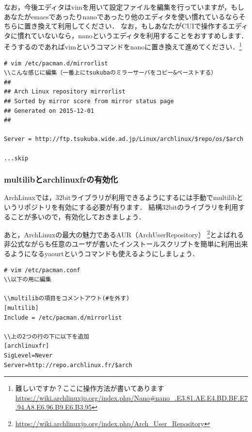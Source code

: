 \documentclass[b5j,twoside,openany]{jsbook}
\begin{document}
        なお，今後エディタはvimを用いて設定ファイルを編集を行っていますが，もしあなたがemacsであったりnanoであったり他のエディタを使い慣れているならそちらに置き換えて利用してください．
        なお，もしあなたがCUIで操作するエディタに慣れていないなら，nanoというエディタを利用することをおすすめします．そうするのであればvimというコマンドをnanoに置き換えて進めてください．\footnote{難しいですか？ここに操作方法が書いてあります \url{https://wiki.archlinuxjp.org/index.php/Nano#nano_.E3.81.AE.E4.BD.BF.E7.94.A8.E6.96.B9.E6.B3.95}}

         \begin{screen}
\begin{verbatim}
# vim /etc/pacman.d/mirrorlist
\\こんな感じに編集（一番上にtsukubaのミラーサーバをコピー&ペーストする）
##
## Arch Linux repository mirrorlist
## Sorted by mirror score from mirror status page
## Generated on 2015-12-01
##

Server = http://ftp.tsukuba.wide.ad.jp/Linux/archlinux/$repo/os/$arch

...skip
\end{verbatim}
        \end{screen}

      \subsubsection{multilibとarchlinuxfrの有効化}
        ArchLinuxでは，32bitライブラリが利用できるようにするには手動でmultilibというリポジトリを有効にする必要が有ります．
        結構32bitのライブラリを利用することが多いので，有効化しておきましょう．
        
        あと，ArchLinuxの最大の魅力であるAUR（ArchUserRepository） \footnote{\url{https://wiki.archlinuxjp.org/index.php/Arch_User_Repository}}とよばれる非公式ながらも任意のユーザが書いたインストールスクリプトを簡単に利用出来るようになるyaourtというコマンドも使えるようにしましょう．

        \begin{screen}
\begin{verbatim}
# vim /etc/pacman.conf
\\以下の用に編集

\\multilibの項目をコメントアウト(#を外す)
[multilib]
Include = /etc/pacman.d/mirrorlist

\\上の2つの行の下に以下を追加
[archlinuxfr]
SigLevel=Never
Server=http://repo.archlinux.fr/$arch
\end{verbatim}
        \end{screen}
\end{document}
